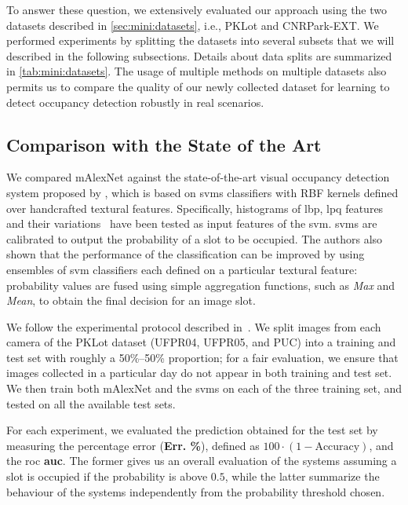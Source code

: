 To answer these question, we extensively evaluated our approach using the two datasets described in \ref{sec:mini:datasets}, i.e., PKLot and CNRPark-EXT.
We performed experiments by splitting the datasets into several subsets that we will described in the following subsections.
Details about data splits are summarized in \ref{tab:mini:datasets}.
The usage of multiple methods on multiple datasets also permits us to compare the quality of our newly collected dataset for learning to detect occupancy detection robustly in real scenarios.


\subsection{Comparison with the State of the Art}
\label{sub:mini:sota}

We compared mAlexNet against the state-of-the-art visual occupancy detection system proposed by \citet{de2015pklot}, which is based on \glspl{svm} classifiers with RBF kernels defined over handcrafted textural features.
Specifically, histograms of \gls{lbp}, \gls{lpq} features and their variations~\cite{ojala2002multiresolution, ojansivu2008blur, rahtu2012local} have been tested as input features of the \gls{svm}.
\Glspl{svm} are calibrated to output the probability of a slot to be occupied.
The authors also shown that the performance of the classification can be improved by using ensembles of \gls{svm} classifiers each defined on a particular textural feature:
probability values are fused using simple aggregation functions, such as \emph{Max} and \emph{Mean}, to obtain the final decision for an image slot.

We follow the experimental protocol described in~\cite{de2015pklot}.
We split images from each camera of the PKLot dataset (UFPR04, UFPR05, and PUC) into a training and test set with roughly a 50\%--50\% proportion;
for a fair evaluation, we ensure that images collected in a particular day do not appear in both training and test set.
We then train both mAlexNet and the \glspl{svm} on each of the three training set, and tested on all the available test sets.
%

For each experiment, we evaluated the prediction obtained for the test set by measuring the percentage error (\textbf{Err. \%}), defined as $100 \cdot (1 - \text{Accuracy})$, and the \gls{roc} \textbf{\gls{auc}}.
The former gives us an overall evaluation of the systems assuming a slot is occupied if the probability is above $0.5$, while the latter summarize the behaviour of the systems independently from the probability threshold chosen.


